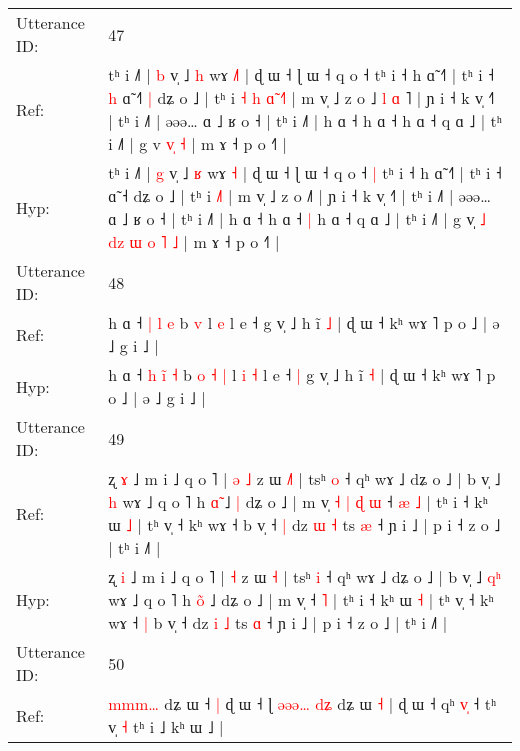\documentclass[10pt]{article}
\DeclareRobustCommand{\hl}[1]{{\textcolor{red}{#1}}}
\begin{document}
\begin{longtable}{ll}
 \\
\midrule
Utterance ID: & 47 \\
Ref: & tʰ i ˩˥ | \hl{b} v̩ ˩ \hl{h} wɤ \hl{˩}\hl{˥} | ɖ ɯ ˧ ɭ ɯ ˧ q o ˧\hl{}\hl{} tʰ i ˧ h ɑ̃ ˧˥ | tʰ i ˧\hl{ }\hl{h} ɑ̃ ˧\hl{˥}\hl{ }\hl{|} dʑ o ˩ | tʰ i\hl{ }\hl{˧}\hl{ }\hl{h}\hl{ }\hl{ɑ}\hl{̃} \hl{˧}˥ | m v̩ ˩ z o ˩\hl{ }\hl{l}\hl{ }\hl{ɑ}\hl{ }˥ | ɲ i ˧ k v̩ ˧˥ | tʰ i ˩˥ | əəə… ɑ ˩ ʁ o ˧ | tʰ i ˩˥ | h ɑ ˧ h ɑ ˧\hl{}\hl{} h ɑ ˧ q ɑ ˩ | tʰ i ˩˥ | g v\hl{}\hl{}\hl{}\hl{}\hl{}\hl{}\hl{}\hl{} \hl{}\hl{v}\hl{̩} \hl{˧} | m ɤ ˧ p o ˧˥ |
 \\
Hyp: & tʰ i ˩˥ | \hl{g} v̩ ˩ \hl{ʁ} wɤ \hl{}\hl{˧} | ɖ ɯ ˧ ɭ ɯ ˧ q o ˧\hl{ }\hl{|} tʰ i ˧ h ɑ̃ ˧˥ | tʰ i ˧\hl{}\hl{} ɑ̃ ˧\hl{}\hl{}\hl{} dʑ o ˩ | tʰ i\hl{}\hl{}\hl{}\hl{}\hl{}\hl{}\hl{} \hl{˩}˥ | m v̩ ˩ z o ˩\hl{}\hl{}\hl{}\hl{}\hl{}˥ | ɲ i ˧ k v̩ ˧˥ | tʰ i ˩˥ | əəə… ɑ ˩ ʁ o ˧ | tʰ i ˩˥ | h ɑ ˧ h ɑ ˧\hl{ }\hl{|} h ɑ ˧ q ɑ ˩ | tʰ i ˩˥ | g v\hl{̩}\hl{ }\hl{˩}\hl{ }\hl{d}\hl{z}\hl{ }\hl{ɯ} \hl{o}\hl{ }\hl{˥} \hl{˩} | m ɤ ˧ p o ˧˥ |
 \\
\midrule
Utterance ID: & 48 \\
Ref: & h ɑ ˧ \hl{|} \hl{}\hl{l} \hl{e} b\hl{}\hl{}\hl{}\hl{} \hl{v} l\hl{}\hl{} \hl{e} l e ˧\hl{}\hl{} g v̩ ˩ h ĩ \hl{˩} | ɖ ɯ ˧ kʰ wɤ ˥ p o ˩ | ə ˩ g i ˩ |
 \\
Hyp: & h ɑ ˧ \hl{h} \hl{i}\hl{̃} \hl{˧} b\hl{ }\hl{o}\hl{ }\hl{˧} \hl{|} l\hl{ }\hl{i} \hl{˧} l e ˧\hl{ }\hl{|} g v̩ ˩ h ĩ \hl{˧} | ɖ ɯ ˧ kʰ wɤ ˥ p o ˩ | ə ˩ g i ˩ |
 \\
\midrule
Utterance ID: & 49 \\
Ref: & ʐ \hl{ɤ} ˩ m i ˩ q o ˥ |\hl{ }\hl{ə} \hl{˩} z ɯ \hl{˩}\hl{˥} | tsʰ \hl{o} ˧ qʰ wɤ ˩ dʑ o ˩ | b v̩ ˩ \hl{}\hl{h} wɤ ˩ q o ˥ h \hl{ɑ}̃ ˩\hl{ }\hl{|} dʑ o ˩ | m v̩\hl{ }\hl{˧}\hl{ }\hl{|}\hl{ }\hl{ɖ}\hl{ }\hl{ɯ} ˧\hl{ }\hl{æ} \hl{˩} | tʰ i ˧ kʰ ɯ \hl{˩} | tʰ v̩ ˧ kʰ wɤ ˧\hl{}\hl{} b v̩ ˧\hl{ }\hl{|} dz \hl{ɯ} \hl{˧} ts \hl{æ} ˧ ɲ i ˩ | p i ˧ z o ˩ | tʰ i ˩˥ |
 \\
Hyp: & ʐ \hl{i} ˩ m i ˩ q o ˥ |\hl{}\hl{} \hl{˧} z ɯ \hl{}\hl{˧} | tsʰ \hl{i} ˧ qʰ wɤ ˩ dʑ o ˩ | b v̩ ˩ \hl{q}\hl{ʰ} wɤ ˩ q o ˥ h \hl{o}̃ ˩\hl{}\hl{} dʑ o ˩ | m v̩\hl{}\hl{}\hl{}\hl{}\hl{}\hl{}\hl{}\hl{} ˧\hl{}\hl{} \hl{˥} | tʰ i ˧ kʰ ɯ \hl{˧} | tʰ v̩ ˧ kʰ wɤ ˧\hl{ }\hl{|} b v̩ ˧\hl{}\hl{} dz \hl{i} \hl{˩} ts \hl{ɑ} ˧ ɲ i ˩ | p i ˧ z o ˩ | tʰ i ˩˥ |
 \\
\midrule
Utterance ID: & 50 \\
Ref: & \hl{m}\hl{m}\hl{m}\hl{…}\hl{ }dʑ ɯ ˧\hl{ }\hl{|} ɖ ɯ ˧ ɭ\hl{}\hl{} \hl{ə}\hl{ə}\hl{ə}\hl{…} \hl{}\hl{d}\hl{ʑ} dʑ ɯ \hl{}\hl{˧} | ɖ ɯ ˧ qʰ \hl{v}\hl{̩} ˧ tʰ v̩\hl{}\hl{} \hl{˧} tʰ i ˩ kʰ ɯ ˩ |

\end{longtable}
\end{document}
